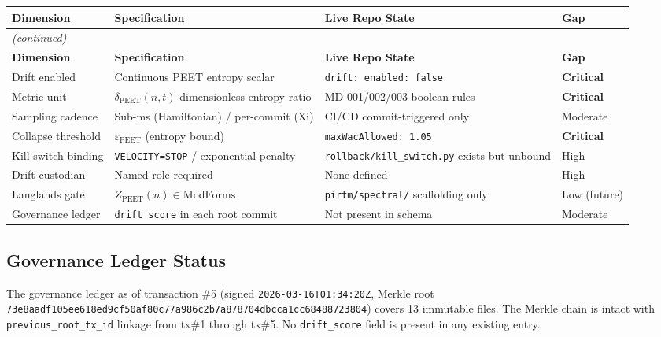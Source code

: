 \documentclass[11pt,letterpaper]{article}
\theoremstyle{definition}
\theoremstyle{remark}
\newcommand{\peet}{\mathrm{PEET}}
\newcommand{\modforms}{\mathrm{ModForms}}
\begin{document}
\begin{longtable}{p{3.2cm} p{3.8cm} p{3.8cm} p{2.5cm}}
\toprule
\textbf{Dimension} & \textbf{Specification} & \textbf{Live Repo State} & \textbf{Gap} \\
\midrule
\endfirsthead
\multicolumn{4}{l}{\small\itshape (continued)} \\
\toprule
\textbf{Dimension} & \textbf{Specification} & \textbf{Live Repo State} & \textbf{Gap} \\
\midrule
\endhead
\bottomrule
\endlastfoot

Drift enabled &
  Continuous PEET entropy scalar &
  \texttt{drift: enabled: false} &
  \textbf{Critical} \\

Metric unit &
  \(\delta_{\peet}(n,t)\) dimensionless entropy ratio &
  MD-001/002/003 boolean rules &
  \textbf{Critical} \\

Sampling cadence &
  Sub-ms (Hamiltonian) / per-commit (Xi) &
  CI/CD commit-triggered only &
  Moderate \\

Collapse threshold &
  \(\varepsilon_{\peet}\) (entropy bound) &
  \texttt{maxWacAllowed: 1.05} &
  \textbf{Critical} \\

Kill-switch binding &
  \texttt{VELOCITY=STOP} / exponential penalty &
  \texttt{rollback/kill\_switch.py} exists but unbound &
  High \\

Drift custodian &
  Named role required &
  None defined &
  High \\

Langlands gate &
  \(Z_{\peet}(n) \in \modforms\) &
  \texttt{pirtm/spectral/} scaffolding only &
  Low (future) \\

Governance ledger &
  \texttt{drift\_score} in each root commit &
  Not present in schema &
  Moderate \\
\end{longtable}

\subsection{Governance Ledger Status}

The governance ledger as of transaction \#5 (signed
\texttt{2026-03-16T01:34:20Z}, Merkle root
\texttt{73e8aadf105ee618ed9cf50af80c77a986c2b7a878704dbcca1cc68488723804})
covers 13 immutable files. The Merkle chain is intact with
\texttt{previous\_root\_tx\_id} linkage from tx\#1 through tx\#5.
No \texttt{drift\_score} field is present in any existing entry.
\end{document}
